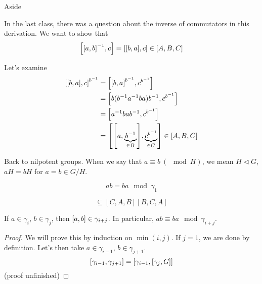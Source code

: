 \documentclass[a4paper,twoside,master.tex]{subfiles}
\begin{document}

\begin{note}{Aside}
    
    In the last class, there was a question about the inverse of commutators in this derivation. We want to show that
    \begin{equation}
        \comm{\comm{a}{b}^{-1}}{c} = \comm{\comm{b}{a}}{c} \in [A,B,C]
    \end{equation}

    Let's examine
    \begin{align}
        \comm{\comm{b}{a}}{c}^{b^{-1}} &= \comm{\comm{b}{a}^{b^{-1}}}{c^{b^{-1}}} \\
        &= \comm{b(b^{-1} a^{-1} b a)b^{-1}}{c^{b^{-1}}} \\
        &= \comm{a^{-1} b a b^{-1}}{c^{b^{-1}}} \\
        &= \comm{\comm{a}{\underbrace{b^{-1}}_{\in B}}}{\underbrace{c^{b^{-1}}}_{\in C}} \in [A,B,C]
    \end{align}
\end{note}

Back to nilpotent groups. When we say that $ a \equiv b\ (\mod{H}) $, we mean $ H \triangleleft G $, $ aH = bH $ for $ a = b \in G/H $.

\begin{equation}
    ab = b a \mod{\gamma_1}
\end{equation}

\begin{claim}
    \begin{equation}
        [A,B,C] \subseteq [C,A,B] [B,C,A]
    \end{equation}
\end{claim}

\begin{claim}
    If $ a \in \gamma_i $, $ b \in \gamma_j $, then $ \comm{a}{b} \in \gamma_{i+j} $. In particular, $ a b \equiv b a \mod{\gamma_{i+j}} $.
\end{claim}
\begin{proof}
    We will prove this by induction on $ \min(i,j) $. If $ j=1 $, we are done by definition. Let's then take $ a \in \gamma_{i-1} $, $ b \in \gamma_{j+1} $.
    \begin{equation}
        \comm{\gamma_{i-1}}{\gamma_{j+1}} = \comm{\gamma_{i-1}}{\comm{\gamma_{j}}{G}}
    \end{equation}
    (proof unfinished)
\end{proof}
\end{document}
